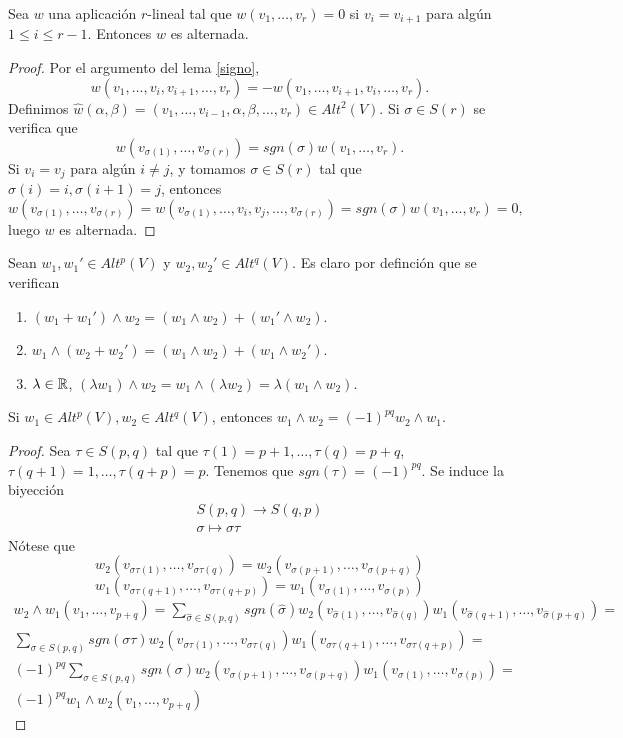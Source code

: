 \documentclass[CV.tex]{subfiles}
\begin{document}
\begin{lemma}\label{alternado} Sea $w$ una aplicación $r$-lineal tal que $w(v_1,\dots, v_r)=0$ si $v_i=v_{i+1}$ para algún $1\leq i\leq r-1$. Entonces $w$ es alternada.
\end{lemma}
\begin{proof}
Por el argumento del lema \ref{signo}, 
$$w(v_1,\dots,v_i,v_{i+1},\dots, v_r)=-w(v_1,\dots,v_{i+1},v_i,\dots, v_r).$$
Definimos $\hat{w}(\alpha,\beta)=(v_1,\dots,v_{i-1},\alpha,\beta,\dots, v_r)\in Alt^2(V)$. Si $\sigma\in S(r)$ se verifica que
$$w(v_{\sigma(1)},\dots, v_{\sigma(r)})=sgn(\sigma)w(v_1,\dots, v_r).$$
Si $v_i=v_j$ para algún $i\neq j$, y tomamos $\sigma\in S(r)$ tal que $\sigma(i)=i, \sigma(i+1)=j$, entonces
$$w(v_{\sigma(1)},\dots,v_{\sigma(r)})=w(v_{\sigma(1)},\dots,v_i,v_j,\dots,v_{\sigma(r)})=sgn(\sigma)w(v_1,\dots, v_r)=0,$$
luego $w$ es alternada.

\end{proof}

\begin{propi} 
Sean $w_1,w_1'\in Alt^p(V)$ y $w_2,w_2'\in Alt^q(V)$. Es claro por definción que se verifican
\begin{enumerate}
\item $(w_1+w_1')\land w_2=(w_1\land w_2)+(w_1'\land w_2)$.
\item $w_1\land (w_2+w_2')=(w_1\land w_2)+(w_1\land w_2')$.
\item $\lambda\in\mathbb{R}$, $(\lambda w_1)\land w_2=w_1\land (\lambda w_2)=\lambda (w_1\land w_2)$.
\end{enumerate}
\end{propi}

\begin{lemma}
Si $w_1\in Alt^p(V), w_2\in Alt^q(V)$, entonces $w_1\land w_2=(-1)^{pq}w_2\land w_1$.
\end{lemma}
\begin{proof}
Sea $\tau\in S(p,q)$ tal que $\tau(1)=p+1,\dots, \tau(q)=p+q$, $\tau(q+1)=1,\dots,\tau(q+p)=p$. Tenemos que $sgn(\tau)=(-1)^{pq}$. Se induce la biyección
\begin{gather*}
S(p,q)\longrightarrow S(q,p)\\
\sigma\longmapsto \sigma\tau
\end{gather*}
Nótese que
$$w_2(v_{\sigma\tau(1)},\dots,v_{\sigma\tau(q)})=w_2(v_{\sigma(p+1)},\dots, v_{\sigma(p+q)})$$
$$w_1(v_{\sigma\tau(q+1)},\dots,v_{\sigma\tau(q+p)})=w_1(v_{\sigma(1)},\dots, v_{\sigma(p)})$$
\begin{gather*}
w_2\land w_1(v_1,\dots, v_{p+q})=\sum_{\hat{\sigma}\in S(p,q)}sgn(\hat{\sigma})w_2(v_{\hat{\sigma}(1)},\dots, v_{\hat{\sigma}(q)})w_1(v_{\hat{\sigma}(q+1)},\dots, v_{\hat{\sigma}(p+q)})=\\
\sum_{\sigma\in S(p,q)}sgn(\sigma\tau)w_2(v_{\sigma\tau(1)},\dots, v_{\sigma\tau(q)})w_1(v_{\sigma\tau(q+1)},\dots, v_{\sigma\tau(q+p)})=\\
(-1)^{pq}\sum_{\sigma\in S(p,q)}sgn(\sigma)w_2(v_{\sigma(p+1)},\dots,v_{\sigma(p+q)})w_1(v_{\sigma(1)},\dots, v_{\sigma(p)})=\\
(-1)^{pq}w_1\land w_2(v_1,\dots, v_{p+q})
\end{gather*}
\end{proof}
\end{document}
